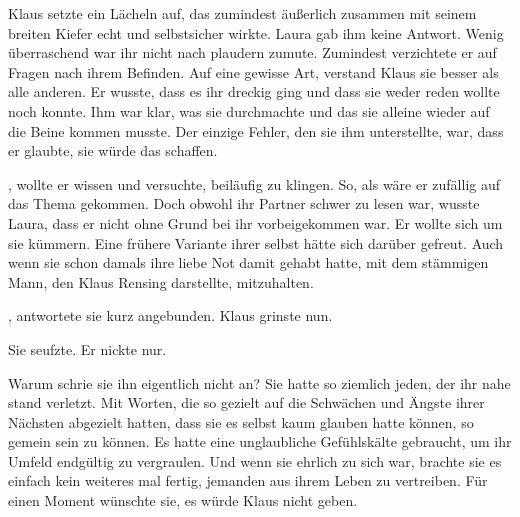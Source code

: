 Klaus setzte ein Lächeln auf, das zumindest äußerlich zusammen mit seinem breiten Kiefer echt und selbstsicher wirkte.
Laura gab ihm keine Antwort.
Wenig überraschend war ihr nicht nach plaudern zumute.
Zumindest verzichtete er auf Fragen nach ihrem Befinden.
Auf eine gewisse Art, verstand Klaus sie besser als alle anderen.
Er wusste, dass es ihr dreckig ging und dass sie weder reden wollte noch konnte.
Ihm war klar, was sie durchmachte und das sie alleine wieder auf die Beine kommen musste.
Der einzige Fehler, den sie ihm unterstellte, war, dass er glaubte, sie würde das schaffen.

\par

, wollte er wissen und versuchte, beiläufig zu klingen.
So, als wäre er zufällig auf das Thema gekommen.
Doch obwohl ihr Partner schwer zu lesen war, wusste Laura, dass er nicht ohne Grund bei ihr vorbeigekommen war.
Er wollte sich um sie kümmern.
Eine frühere Variante ihrer selbst hätte sich darüber gefreut.
Auch wenn sie schon damals ihre liebe Not damit gehabt hatte, mit dem stämmigen Mann, den Klaus Rensing darstellte, mitzuhalten.

\par

, antwortete sie kurz angebunden.
Klaus grinste nun.

\par

Sie seufzte.
Er nickte nur.

\par

Warum schrie sie ihn eigentlich nicht an?
Sie hatte so ziemlich jeden, der ihr nahe stand verletzt.
Mit Worten, die so gezielt auf die Schwächen und Ängste ihrer Nächsten abgezielt hatten, dass sie es selbst kaum glauben hatte können, so gemein sein zu können.
Es hatte eine unglaubliche Gefühlskälte gebraucht, um ihr Umfeld endgültig zu vergraulen.
Und wenn sie ehrlich zu sich war, brachte sie es einfach kein weiteres mal fertig, jemanden aus ihrem Leben zu vertreiben.
Für einen Moment wünschte sie, es würde Klaus nicht geben.

\par


